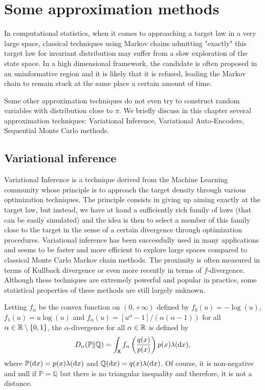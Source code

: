 \documentclass[english,graybox,envcountchap,envcountsame,sectrefs,shortlabels]{svmono}
\theoremstyle{style}
\begin{document}
\section{Some approximation methods}
In computational statistics, when it comes to approaching a target law in a very large space,
classical techniques using Markov chains admitting "exactly" this target law
for invariant distribution may suffer from a slow exploration of the state space. In a high dimensional framework, the candidate is often proposed in an uninformative region and it is likely that it is refused, leading the Markov chain to remain stuck at the same place a certain amount of time.

Some other approximation techniques do not even try to construct random variables with distribution close to $\pi$. We briefly discuss in this chapter several approximation techniques: Variational Inference, Variational Auto-Encoders, Sequential Monte Carlo methods.

\subsection{Variational inference}
Variational Inference is a technique derived from the Machine Learning community whose principle is to approach the target density through various optimization techniques. The principle consists in giving up aiming exactly at the target law, but instead, we have at hand a sufficiently rich family of laws (that can be easily simulated) and the idea is then to select a member of this family close to the target in the sense of a certain divergence through optimization procedures. Variational inference has been successfully used in many applications and seems to be faster and more efficient to explore large spaces compared to classical Monte Carlo Markov chain methods. The proximity is often measured in terms of Kullback divergence or even more recently in terms of $f$-divergence. Although these techniques are extremely powerful and popular in practice, some statistical properties of these methods are still largely unknown.

Letting $f_\alpha$ be the convex function on $(0, +\infty)$ defined by $f_0(u) = -\log(u)$, $f_1(u) = u\log(u)$ and $f_\alpha(u) = [  u^\alpha -1 ]/(\alpha(\alpha-1))$ for all $\alpha \in \mathbb{R} \setminus \left\{ 0,1\right\}$, the $\alpha$-divergence for all $\alpha \in \mathbb{R}$ is defined by
\begin{align}\label{eq:gen:div}
D_\alpha(\mathbb{P}\|\mathbb{Q}) = \int_{\mathsf{X}} f_\alpha\left(\frac{q(x)}{p(x)} \right)p(x) \lambda(\mathrm{d} x), 
\end{align}
where $\mathbb{P}(\mathrm{d} x)=p(x)\lambda(\mathrm{d} x)$ and $\mathbb{Q}(\mathrm{d} x)=q(x) \lambda(\mathrm{d} x)$. Of course, it is non-negative and null if $\mathbb{P}=\mathbb{Q}$ but there is no triangular inequality and therefore, it is not a distance.
\end{document}

